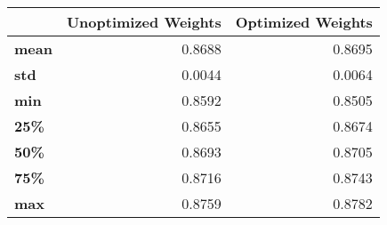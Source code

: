 \begin{tabular}{lrr}
\toprule
{} &  Unoptimized Weights &  Optimized Weights \\
\midrule
\textbf{mean} &               0.8688 &             0.8695 \\
\textbf{std } &               0.0044 &             0.0064 \\
\textbf{min } &               0.8592 &             0.8505 \\
\textbf{25\% } &               0.8655 &             0.8674 \\
\textbf{50\% } &               0.8693 &             0.8705 \\
\textbf{75\% } &               0.8716 &             0.8743 \\
\textbf{max } &               0.8759 &             0.8782 \\
\bottomrule
\end{tabular}
